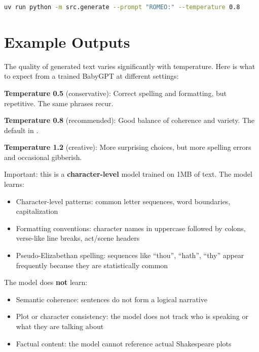 \shelltag
\begin{lstlisting}[language=bash]
uv run python -m src.generate --prompt "ROMEO:" --temperature 0.8
\end{lstlisting}


\section{Example Outputs}

The quality of generated text varies significantly with temperature. Here is what to expect from a trained BabyGPT at different settings:

\textbf{Temperature 0.5} (conservative): Correct spelling and formatting, but repetitive. The same phrases recur.

\textbf{Temperature 0.8} (recommended): Good balance of coherence and variety. The default in .

\textbf{Temperature 1.2} (creative): More surprising choices, but more spelling errors and occasional gibberish.

Important: this is a \textbf{character-level} model trained on 1MB of text. The model learns:

\begin{itemize}
  \item Character-level patterns: common letter sequences, word boundaries, capitalization
  \item Formatting conventions: character names in uppercase followed by colons, verse-like line breaks, act/scene headers
  \item Pseudo-Elizabethan spelling: sequences like ``thou'', ``hath'', ``thy'' appear frequently because they are statistically common
\end{itemize}

The model does \textbf{not} learn:

\begin{itemize}
  \item Semantic coherence: sentences do not form a logical narrative
  \item Plot or character consistency: the model does not track who is speaking or what they are talking about
  \item Factual content: the model cannot reference actual Shakespeare plots
\end{itemize}

